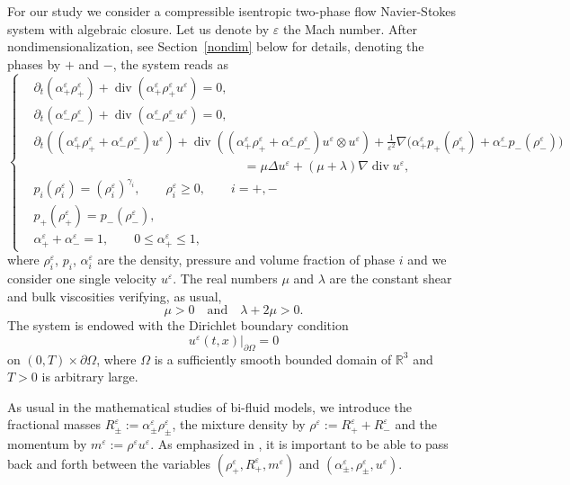 \documentclass[11pt, twoside, a4paper]{article}
\theoremstyle{plain}
\theoremstyle{remark}
\numberwithin{equation}{section}
\renewcommand{\div}{\operatorname{div}}
\renewcommand{\leq}{\leqslant}\renewcommand{\le}{\leqslant}
\renewcommand{\geq}{\geqslant}\renewcommand{\ge}{\geqslant}
\renewcommand{\epsilon}{\varepsilon}
\newcommand{\eps}{\varepsilon}
\newcommand{\ap}{\alpha_+}
\newcommand{\am}{\alpha_-}
\newcommand{\rmi}{\rho_-}
\begin{document}
For our study we consider a compressible isentropic two-phase flow Navier-Stokes system with algebraic closure. Let us denote by $\eps$ the Mach number. After nondimensionalization, see Section~\ref{nondim} below for details, denoting the phases by $+$ and $-$, the system reads as
\begin{equation}
 \left\{
 \begin{aligned}\label{system_eps}
 &\partial_t (\alpha_+^{\epsilon} \rho_+^{\epsilon}) + \div(\alpha_+^{\epsilon}\rho_+^{\epsilon}u^{\epsilon}) = 0,\\
 &\partial_t (\alpha_-^{\epsilon} \rho_-^{\epsilon}) + \div(\alpha_-^{\epsilon}\rho_-^{\epsilon}u^{\epsilon}) = 0,\\
 &\partial_t ((\alpha_+^{\epsilon} \rho_+^{\epsilon} + \alpha_-^{\epsilon}\rho_-^{\epsilon})u^{\epsilon}) + \div((\alpha_+^{\epsilon}\rho_+^{\epsilon} + \alpha_-^{\epsilon}\rho_-^{\epsilon})u^{\epsilon}\otimes u^{\epsilon})+ \frac{1}{\epsilon^2} \nabla \Big(\ap^\eps p_+(\rho_+^{\epsilon}) + \am^\eps p_-(\rmi^\eps)\Big) \\
 &\hspace{7cm} = \mu \Delta u^{\epsilon} + (\mu + \lambda)\nabla \div u^{\epsilon},\\
 &p_i(\rho_i^{\epsilon}) = (\rho_i^{\epsilon})^{\gamma_i},\qquad \rho_i^\epsilon \geq 0, \qquad i=+,-\\
 &p_+(\rho_+^{\epsilon}) = p_-(\rho_-^{\epsilon}),\\
 &\alpha_+^{\epsilon} + \alpha_-^{\epsilon} = 1,\qquad 0\leq \ap^\epsilon \leq 1,
 \end{aligned}
 \right .
\end{equation}
where $\rho_i^\eps$, $p_i$, $\alpha_i^\eps$ are the density, pressure and volume fraction of phase $i$ and we consider one single velocity $u^\eps$. The real numbers $\mu$ and $\lambda$ are the constant shear and bulk viscosities verifying, as usual,
\[
\mu >0 \quad \text{and} \quad \lambda + 2 \mu>0.
\]
The system is endowed with the Dirichlet boundary condition
\begin{equation}\label{eq.bc}
 u^\eps(t,x)\lvert_{\partial \Omega} = 0
\end{equation}
on $(0,T) \times \partial \Omega$, where $\Omega$ is a sufficiently smooth bounded domain of $\mathbb{R}^3$ and $T>0$ is arbitrary large.

As usual in the mathematical studies of bi-fluid models, we introduce the fractional masses $R_\pm^\eps := \alpha_\pm^\eps \rho_\pm^\eps$, the mixture density by $\rho^\eps := R_+^\eps + R_-^\eps$ and the momentum by $m^\eps:=\rho^\eps u^\eps$. As emphasized in \cite{BreschHuangLi}, it is important to be able to pass back and forth between the variables $(\rho_{+}^\eps,R_{+}^\eps, m^\epsilon)$ and $(\alpha_\pm^\eps, \rho_\pm^\eps,u^\eps)$.
\end{document}
